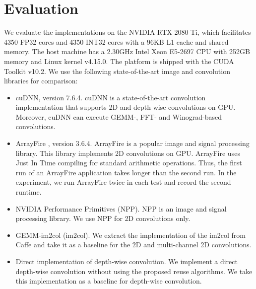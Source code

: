 \section{Evaluation}
\label{exp}
We evaluate the implementations on the NVIDIA RTX 2080 Ti, which facilitates 4350 FP32 cores and 4350 INT32 cores with a 96KB L1 cache and shared memory. The host machine has a 2.30GHz Intel Xeon E5-2697
CPU with 252GB memory and Linux kernel v4.15.0. The platform is shipped with the CUDA Toolkit v10.2. We use the following state-of-the-art image and convolution libraries for comparison:
\begin{itemize}
  \item cuDNN, version 7.6.4. cuDNN is a state-of-the-art convolution implementation that supports 2D and depth-wise convolutions on GPU.
      Moreover, cuDNN can execute GEMM-, FFT- and Winograd-based convolutions.
  \item ArrayFire \cite{Yalamanchili2015}, version 3.6.4. ArrayFire is a popular image and signal processing library. This library implements 2D convolutions on GPU. ArrayFire uses Just In Time compiling for standard arithmetic operations. Thus, the first run of an ArrayFire application takes longer than the second run.
      In the experiment, we run ArrayFire twice in each test and record the second runtime.
  \item NVIDIA Performance Primitives (NPP). NPP is an image and signal processing library. We use NPP for 2D convolutions only.
  \item GEMM-im2col (im2col). We extract the implementation of the im2col from Caffe \cite{jia2014caffe} and take it as a baseline for the 2D and multi-channel 2D convolutions.
  \item Direct implementation of depth-wise convolution. We implement a direct depth-wise convolution without using the proposed reuse algorithms. We take this implementation as a baseline for depth-wise convolution.

\end{itemize}



